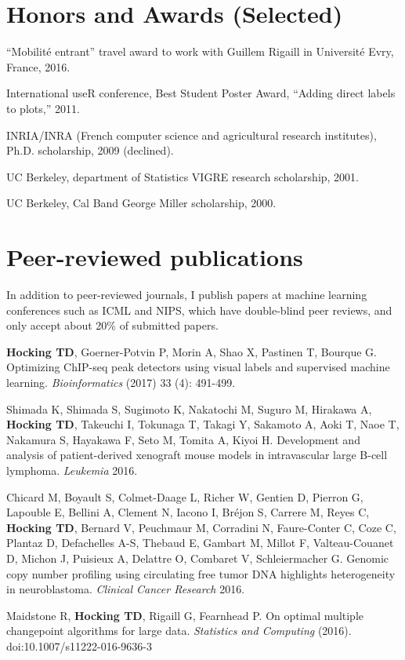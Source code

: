 \documentclass[margin,line]{res}
\begin{document}
\begin{resume}
\section{\sc Honors and Awards (Selected)}

``Mobilit\'e entrant'' travel award to work with Guillem Rigaill in
Universit\'e Evry, France, 2016.

International useR conference, Best Student Poster Award, ``Adding
direct labels to plots,'' 2011.

INRIA/INRA (French computer science and agricultural research institutes), Ph.D. scholarship, 2009 (declined).

UC Berkeley, department of Statistics VIGRE research scholarship, 2001.

UC Berkeley, Cal Band George Miller scholarship, 2000.

\section{\sc Peer-reviewed publications}

In addition to peer-reviewed journals, I publish papers at
machine learning conferences such as ICML and NIPS, which have
double-blind peer reviews, and only accept about 20\% of submitted
papers.

{\bf Hocking TD}, Goerner-Potvin P, Morin A, Shao X, Pastinen T,
Bourque G. Optimizing ChIP-seq peak detectors using visual labels and
supervised machine learning. {\it Bioinformatics} (2017) 33 (4): 491-499.

Shimada K, Shimada S, Sugimoto K, Nakatochi M, Suguro M, Hirakawa A,
{\bf Hocking TD}, Takeuchi I, Tokunaga T, Takagi Y, Sakamoto A, Aoki T, Naoe
T, Nakamura S, Hayakawa F, Seto M, Tomita A, Kiyoi H. Development and
analysis of patient-derived xenograft mouse models in intravascular
large B-cell lymphoma. {\it Leukemia} 2016.

Chicard M, Boyault S, Colmet-Daage L, Richer W, Gentien D, Pierron G,
Lapouble E, Bellini A, Clement N, Iacono I, Bréjon S, Carrere M, Reyes
C, {\bf Hocking TD}, Bernard V, Peuchmaur M, Corradini N, Faure-Conter
C, Coze C, Plantaz D, Defachelles A-S, Thebaud E, Gambart M, Millot F,
Valteau-Couanet D, Michon J, Puisieux A, Delattre O, Combaret V,
Schleiermacher G. Genomic copy number profiling using circulating free
tumor DNA highlights heterogeneity in neuroblastoma. {\it Clinical Cancer
Research} 2016.

Maidstone R, {\bf Hocking TD}, Rigaill G, Fearnhead P. On optimal
multiple changepoint algorithms for large data. {\it Statistics and
Computing} (2016). doi:10.1007/s11222-016-9636-3 


\end{resume}
\end{document}
